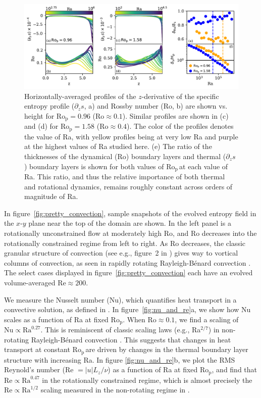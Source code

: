 \documentclass[twocolumn, amsmath, amsfonts, amssymb, trackchanges]{aastex62}
\newcommand{\RB}{Rayleigh-B\'{e}nard }
\newcommand{\pro}{\ensuremath{\text{Ro}_{\text{p}}}}
\begin{document}
\begin{figure}[ht!]
    \includegraphics[width=\textwidth]{boundary_layers.pdf}
    \caption{Horizontally-averaged profiles of the $z$-derivative of 
    the specific entropy profile ($\partial_z s$, a) and Rossby number (Ro, b) 
    are shown vs. height for $\pro = 0.96$ ($\text{Ro} \approx 0.1$). 
    Similar profiles are shown in (c) and (d) for $\pro = 1.58$ ($\text{Ro} \approx 0.4$). The color of the profiles
    denotes the value of Ra, with yellow profiles being at very low Ra and purple at the highest
    values of Ra studied here.
    (e) The ratio of the thicknesses of the dynamical (Ro) boundary layers and 
    thermal ($\partial_z s$) boundary layers is shown for both values of \pro$\,$at each value of Ra.
    This ratio, and thus the relative importance of both thermal and rotational dynamics,
	remains roughly constant across orders of magnitude of Ra.
    \label{fig:profiles_and_bls} }
\end{figure}

In figure~\ref{fig:pretty_convection}, sample snapshots
of the evolved entropy field in the $x$-$y$ plane near the top of the domain are shown. 
In the left panel is a rotationally unconstrained flow at moderately high
Ro, and Ro decreases into the rotationally constrained regime from left to right.
As Ro decreases, the
classic granular structure of convection (see e.g., figure~2 in \AB) gives way to vortical
columns of convection, as seen in rapidly rotating \RB convection \citep{stellmach&all2014}.
The select cases displayed in figure~\ref{fig:pretty_convection} each have an evolved volume-averaged
$\text{Re} \approx 200$.

We measure the Nusselt number (Nu), which quantifies heat transport in a convective
solution, as defined in \AB.
In figure~\ref{fig:nu_and_re}a, we show how Nu scales as a function
of Ra at fixed \pro. When $\text{Ro} \approx 0.1$,
we find a scaling of $\text{Nu} \propto \text{Ra}^{0.27}$. This is reminiscent of
classic scaling laws (e.g., Ra$^{2/7}$) in non-rotating \RB convection \citep{ahlers&all2009}.
This suggests that changes in heat transport at constant \pro$\,$are driven by
changes in the thermal boundary layer structure with increasing Ra.
In figure \ref{fig:nu_and_re}b, we plot the RMS Reynold's
number (Re $= |u| L_z / \nu$) as a function of Ra at fixed \pro, and find that 
$\text{Re} \propto \text{Ra}^{0.47}$ in the rotationally constrained regime,
which is almost precisely the $\text{Re} \propto \text{Ra}^{1/2}$ scaling measured
in the non-rotating regime in \AB.
\end{document}
